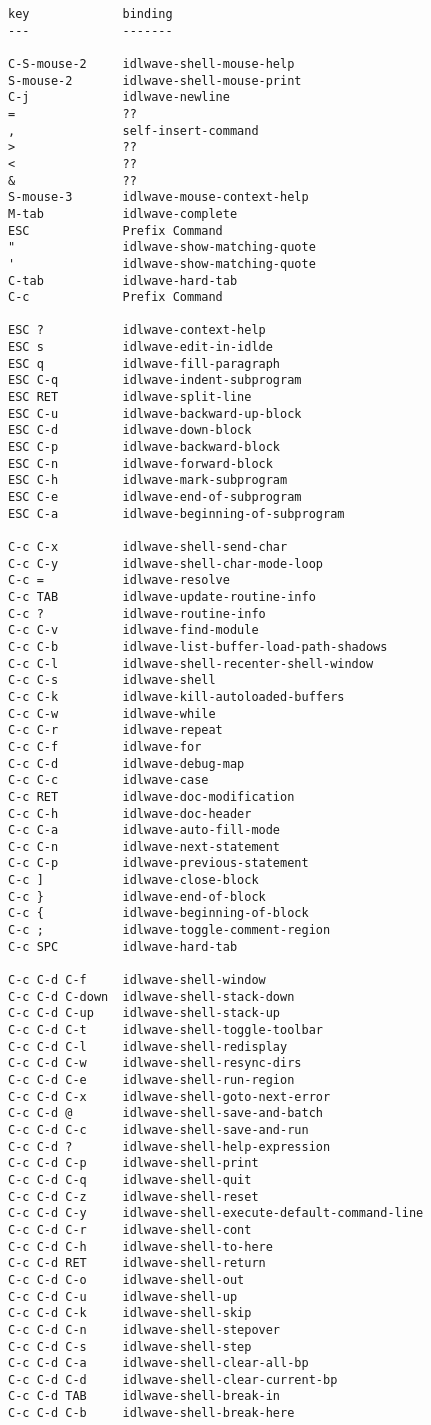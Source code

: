 \begin{verbatim}
key             binding
---             -------

C-S-mouse-2     idlwave-shell-mouse-help
S-mouse-2       idlwave-shell-mouse-print
C-j             idlwave-newline
=               ??
,               self-insert-command
>               ??
<               ??
&               ??
S-mouse-3       idlwave-mouse-context-help
M-tab           idlwave-complete
ESC             Prefix Command
"               idlwave-show-matching-quote
'               idlwave-show-matching-quote
C-tab           idlwave-hard-tab
C-c             Prefix Command

ESC ?           idlwave-context-help
ESC s           idlwave-edit-in-idlde
ESC q           idlwave-fill-paragraph
ESC C-q         idlwave-indent-subprogram
ESC RET         idlwave-split-line
ESC C-u         idlwave-backward-up-block
ESC C-d         idlwave-down-block
ESC C-p         idlwave-backward-block
ESC C-n         idlwave-forward-block
ESC C-h         idlwave-mark-subprogram
ESC C-e         idlwave-end-of-subprogram
ESC C-a         idlwave-beginning-of-subprogram

C-c C-x         idlwave-shell-send-char
C-c C-y         idlwave-shell-char-mode-loop
C-c =           idlwave-resolve
C-c TAB         idlwave-update-routine-info
C-c ?           idlwave-routine-info
C-c C-v         idlwave-find-module
C-c C-b         idlwave-list-buffer-load-path-shadows
C-c C-l         idlwave-shell-recenter-shell-window
C-c C-s         idlwave-shell
C-c C-k         idlwave-kill-autoloaded-buffers
C-c C-w         idlwave-while
C-c C-r         idlwave-repeat
C-c C-f         idlwave-for
C-c C-d         idlwave-debug-map
C-c C-c         idlwave-case
C-c RET         idlwave-doc-modification
C-c C-h         idlwave-doc-header
C-c C-a         idlwave-auto-fill-mode
C-c C-n         idlwave-next-statement
C-c C-p         idlwave-previous-statement
C-c ]           idlwave-close-block
C-c }           idlwave-end-of-block
C-c {           idlwave-beginning-of-block
C-c ;           idlwave-toggle-comment-region
C-c SPC         idlwave-hard-tab

C-c C-d C-f     idlwave-shell-window
C-c C-d C-down  idlwave-shell-stack-down
C-c C-d C-up    idlwave-shell-stack-up
C-c C-d C-t     idlwave-shell-toggle-toolbar
C-c C-d C-l     idlwave-shell-redisplay
C-c C-d C-w     idlwave-shell-resync-dirs
C-c C-d C-e     idlwave-shell-run-region
C-c C-d C-x     idlwave-shell-goto-next-error
C-c C-d @       idlwave-shell-save-and-batch
C-c C-d C-c     idlwave-shell-save-and-run
C-c C-d ?       idlwave-shell-help-expression
C-c C-d C-p     idlwave-shell-print
C-c C-d C-q     idlwave-shell-quit
C-c C-d C-z     idlwave-shell-reset
C-c C-d C-y     idlwave-shell-execute-default-command-line
C-c C-d C-r     idlwave-shell-cont
C-c C-d C-h     idlwave-shell-to-here
C-c C-d RET     idlwave-shell-return
C-c C-d C-o     idlwave-shell-out
C-c C-d C-u     idlwave-shell-up
C-c C-d C-k     idlwave-shell-skip
C-c C-d C-n     idlwave-shell-stepover
C-c C-d C-s     idlwave-shell-step
C-c C-d C-a     idlwave-shell-clear-all-bp
C-c C-d C-d     idlwave-shell-clear-current-bp
C-c C-d TAB     idlwave-shell-break-in
C-c C-d C-b     idlwave-shell-break-here

\end{verbatim}


